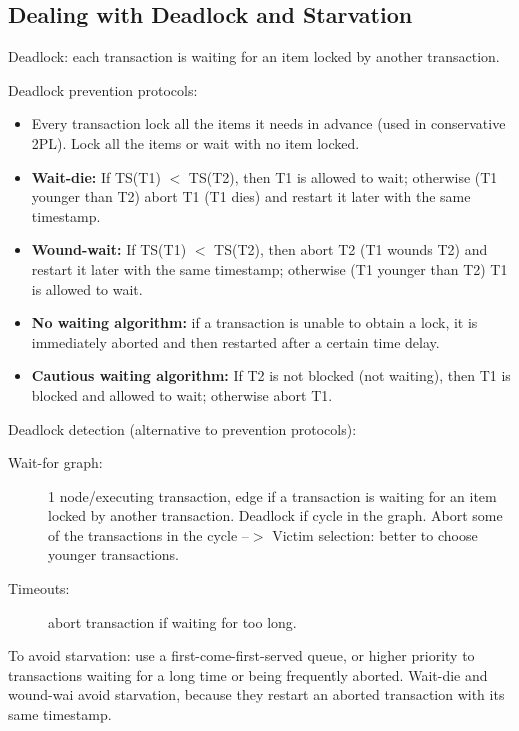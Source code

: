 \subsection{Dealing with Deadlock and Starvation}
Deadlock: each transaction is waiting for an item locked by another transaction.

Deadlock prevention protocols:
\begin{itemize}
    \item Every transaction lock all the items it needs in advance (used in conservative 2PL). Lock all the items or wait with no item locked.
    \item \textbf{Wait-die:} If TS(T1) $<$ TS(T2), then T1 is allowed to wait; otherwise (T1 younger than T2) abort T1 (T1 dies) and restart it later with the same timestamp.
    \item \textbf{Wound-wait:} If TS(T1) $<$ TS(T2), then abort T2 (T1 wounds T2) and restart it later with the same timestamp; otherwise (T1 younger than T2) T1 is allowed to wait.
    \item \textbf{No waiting algorithm:} if a transaction is unable to obtain a lock, it is immediately aborted and then restarted after a certain time delay.
    \item \textbf{Cautious waiting algorithm:} If T2 is not blocked (not waiting), then T1 is blocked and allowed to wait; otherwise abort T1.
\end{itemize}

Deadlock detection (alternative to prevention protocols):\\
\begin{description}
    \item[Wait-for graph:] 1 node/executing transaction, edge if a transaction is waiting for an item locked by another transaction. Deadlock if cycle in the graph. Abort some of the transactions in the cycle --$>$ Victim selection: better to choose younger transactions. 
    \item[Timeouts:] abort transaction if waiting for too long.
\end{description}

To avoid starvation: use a first-come-first-served queue, or higher priority to transactions waiting for a long time or being frequently aborted. Wait-die and wound-wai avoid starvation, because they restart an aborted transaction with its same timestamp.

